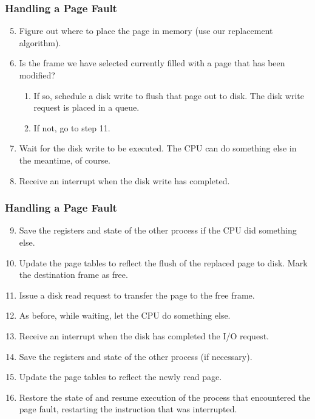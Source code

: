 \begin{frame}
\frametitle{Handling a Page Fault}
\begin{enumerate}
	\setcounter{enumi}{4}
	\item Figure out where to place the page in memory (use our replacement algorithm).
	\item Is the frame we have selected currently filled with a page that has been modified? 
	\begin{enumerate}
		\item If so, schedule a disk write to flush that page out to disk. The disk write request is placed in a queue.
		\item If not, go to step 11.
	\end{enumerate} 
	\item Wait for the disk write to be executed. The CPU can do something else in the meantime, of course.
	\item Receive an interrupt when the disk write has completed.
\end{enumerate}

\end{frame}

\begin{frame}
\frametitle{Handling a Page Fault}

\begin{enumerate}
	\setcounter{enumi}{8}
	\item Save the registers and state of the other process if the CPU did something else.
	\item Update the page tables to reflect the flush of the replaced page to disk. Mark the destination frame as free.
	\item Issue a disk read request to transfer the page to the free frame.
	\item As before, while waiting, let the CPU do something else.
	\item Receive an interrupt when the disk has completed the I/O request.
	\item Save the registers and state of the other process (if necessary).
	\item Update the page tables to reflect the newly read page.
	\item Restore the state of and resume execution of the process that encountered the page fault, restarting the instruction that was interrupted.
\end{enumerate}


\end{frame}

